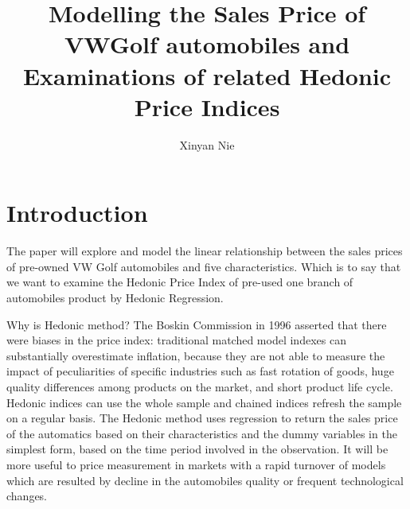 \documentclass[a4paper]{article}
\begin{document}
\title{Modelling the Sales Price of VWGolf automobiles and Examinations of related Hedonic Price Indices
}
\author{Xinyan Nie}
\maketitle

\newpage
\tableofcontents




%
%

\newpage
\section{Introduction}  \label{sec:intro}
The paper will explore and model the linear relationship between the sales prices of pre-owned VW Golf automobiles and five characteristics. Which is to say that we want to examine the Hedonic Price Index of pre-used one branch of automobiles product by Hedonic Regression. 

\noindent
Why is Hedonic method? The Boskin Commission in 1996 asserted that there were biases in the price index: traditional matched model indexes can substantially overestimate inflation, because they are not able to measure the impact of peculiarities of specific industries such as fast rotation of goods, huge quality differences among products on the market, and short product life cycle. Hedonic indices can use the whole sample and chained indices refresh the sample on a regular basis. The Hedonic method uses regression to return the sales price of the automatics based on their characteristics and the dummy variables in the simplest form, based on the time period involved in the observation. It will be more useful to price measurement in markets with a rapid turnover of models which are resulted by decline in the automobiles quality or frequent technological changes.  





\end{document}
